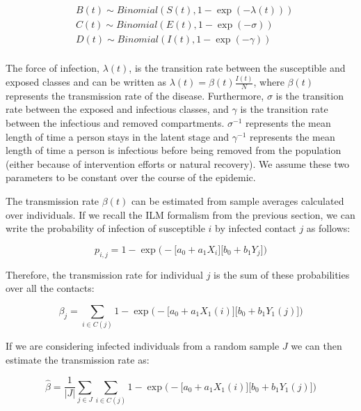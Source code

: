 \documentclass{article}
\begin{document}
\begin{equation}
\begin{aligned}
& B(t) \sim Binomial(S(t), 1-\exp(-\lambda(t))) \\
& C(t) \sim Binomial(E(t), 1-\exp(-\sigma)) \\
& D(t) \sim Binomial(I(t), 1-\exp(-\gamma)) \\
\end{aligned}
\end{equation}

The force of infection, $\lambda(t)$, is the transition rate between the susceptible and exposed classes and can be written as $\lambda(t)=\beta(t)\frac{I(t)}{N}$, where $\beta(t)$ represents the transmission rate of the disease. Furthermore, $\sigma$ is the transition rate between the exposed and infectious classes, and $\gamma$ is the transition rate between the infectious and removed compartments. $\sigma^{-1}$ represents the mean length of time a person stays in the latent stage and  $\gamma^{-1}$ represents the mean length of time a person is infectious before being removed from the population (either because of intervention efforts or natural recovery). We assume these two parameters to be constant over the course of the epidemic.

The transmission rate $\beta(t)$ can be estimated from sample averages calculated over individuals. If we recall the ILM formalism from the previous section, we can write the probability of infection of susceptible $i$ by infected contact $j$ as follows:

\begin{equation}
p_{i,j} =1-\exp\Big( -\big[a_0 + a_1 X_i] \big[b_0 + b_1 Y_j]\Big)
\end{equation}

Therefore, the transmission rate for individual $j$ is the sum of these probabilities over all the contacts:

\begin{equation}
\beta_j = \sum\limits_{i \in C(j)}  1-\exp\Big( -\big[a_0 + a_1 X_1(i)] \big[b_0 + b_1 Y_1(j)]\Big)
\end{equation}

If we are considering infected individuals from a random sample $J$  we can then estimate the transmission rate as:

\begin{equation}
\hat{\beta} = \frac{1}{|J|} \sum\limits_{j \in J}\sum\limits_{i \in C(j)}  1-\exp\Big( -\big[a_0 + a_1 X_1(i)] \big[b_0 + b_1 Y_1(j)]\Big)
\end{equation}
\end{document}
